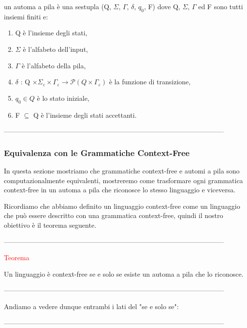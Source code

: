 \documentclass{article}
\begin{document}
un automa a pila è una sestupla (Q, $\Sigma$, $\Gamma$, $\delta$, $q_0$, F) dove
Q, $\Sigma$, $\Gamma$ ed F sono tutti insiemi finiti e:

\begin{enumerate}
    \item Q è l'insieme degli stati,
    \item $\Sigma$ è l'alfabeto dell'input,
    \item $\Gamma$ è l'alfabeto della pila,
    \item $\delta$ : Q $\times \Sigma_\varepsilon \times \Gamma_\varepsilon \rightarrow \mathcal{P} (Q \times \Gamma_\varepsilon)$ è la funzione di transizione,
    \item $q_0 \in Q$ è lo stato iniziale,
    \item F $\subseteq$ Q è l'insieme degli stati accettanti.
\end{enumerate}

--------------------------------------------------------------------------------------------------

\subsubsection{Equivalenza con le Grammatiche Context-Free}

In questa sezione mostriamo che grammatiche context-free e automi a pila sono computazionalmente equivalenti, mostreremo come trasformare ogni grammatica context-free in un automa a pila che riconosce lo stesso linguaggio e viceversa.

Ricordiamo che abbiamo definito un linguaggio context-free come un linguaggio che può essere descritto con una grammatica context-free, quindi il nostro obiettivo è il teorema seguente.

--------------------------------------------------------------------------------------------------

\begin{center}
    \textcolor{red}{Teorema}
\end{center}

Un linguaggio è context-free se e solo se esiste un automa a pila che lo riconosce.

--------------------------------------------------------------------------------------------------

Andiamo a vedere dunque entrambi i lati del "se e solo se":

--------------------------------------------------------------------------------------------------
\end{document}
